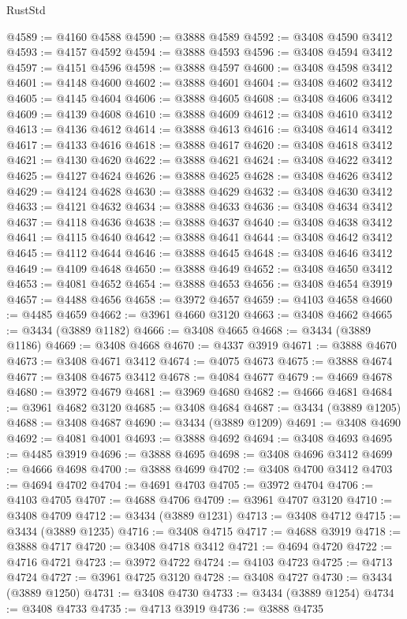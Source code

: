 \begin{lexlean}{RustStd}
\begin{coremodule}
@4589 := @4160 @4588
@4590 := @3888 @4589
@4592 := @3408 @4590 @3412
@4593 := @4157 @4592
@4594 := @3888 @4593
@4596 := @3408 @4594 @3412
@4597 := @4151 @4596
@4598 := @3888 @4597
@4600 := @3408 @4598 @3412
@4601 := @4148 @4600
@4602 := @3888 @4601
@4604 := @3408 @4602 @3412
@4605 := @4145 @4604
@4606 := @3888 @4605
@4608 := @3408 @4606 @3412
@4609 := @4139 @4608
@4610 := @3888 @4609
@4612 := @3408 @4610 @3412
@4613 := @4136 @4612
@4614 := @3888 @4613
@4616 := @3408 @4614 @3412
@4617 := @4133 @4616
@4618 := @3888 @4617
@4620 := @3408 @4618 @3412
@4621 := @4130 @4620
@4622 := @3888 @4621
@4624 := @3408 @4622 @3412
@4625 := @4127 @4624
@4626 := @3888 @4625
@4628 := @3408 @4626 @3412
@4629 := @4124 @4628
@4630 := @3888 @4629
@4632 := @3408 @4630 @3412
@4633 := @4121 @4632
@4634 := @3888 @4633
@4636 := @3408 @4634 @3412
@4637 := @4118 @4636
@4638 := @3888 @4637
@4640 := @3408 @4638 @3412
@4641 := @4115 @4640
@4642 := @3888 @4641
@4644 := @3408 @4642 @3412
@4645 := @4112 @4644
@4646 := @3888 @4645
@4648 := @3408 @4646 @3412
@4649 := @4109 @4648
@4650 := @3888 @4649
@4652 := @3408 @4650 @3412
@4653 := @4081 @4652
@4654 := @3888 @4653
@4656 := @3408 @4654 @3919
@4657 := @4488 @4656
@4658 := @3972 @4657
@4659 := @4103 @4658
@4660 := @4485 @4659
@4662 := @3961 @4660 @3120
@4663 := @3408 @4662
@4665 := @3434 (@3889 @1182)
@4666 := @3408 @4665
@4668 := @3434 (@3889 @1186)
@4669 := @3408 @4668
@4670 := @4337 @3919
@4671 := @3888 @4670
@4673 := @3408 @4671 @3412
@4674 := @4075 @4673
@4675 := @3888 @4674
@4677 := @3408 @4675 @3412
@4678 := @4084 @4677
@4679 := @4669 @4678
@4680 := @3972 @4679
@4681 := @3969 @4680
@4682 := @4666 @4681
@4684 := @3961 @4682 @3120
@4685 := @3408 @4684
@4687 := @3434 (@3889 @1205)
@4688 := @3408 @4687
@4690 := @3434 (@3889 @1209)
@4691 := @3408 @4690
@4692 := @4081 @4001
@4693 := @3888 @4692
@4694 := @3408 @4693
@4695 := @4485 @3919
@4696 := @3888 @4695
@4698 := @3408 @4696 @3412
@4699 := @4666 @4698
@4700 := @3888 @4699
@4702 := @3408 @4700 @3412
@4703 := @4694 @4702
@4704 := @4691 @4703
@4705 := @3972 @4704
@4706 := @4103 @4705
@4707 := @4688 @4706
@4709 := @3961 @4707 @3120
@4710 := @3408 @4709
@4712 := @3434 (@3889 @1231)
@4713 := @3408 @4712
@4715 := @3434 (@3889 @1235)
@4716 := @3408 @4715
@4717 := @4688 @3919
@4718 := @3888 @4717
@4720 := @3408 @4718 @3412
@4721 := @4694 @4720
@4722 := @4716 @4721
@4723 := @3972 @4722
@4724 := @4103 @4723
@4725 := @4713 @4724
@4727 := @3961 @4725 @3120
@4728 := @3408 @4727
@4730 := @3434 (@3889 @1250)
@4731 := @3408 @4730
@4733 := @3434 (@3889 @1254)
@4734 := @3408 @4733
@4735 := @4713 @3919
@4736 := @3888 @4735

\end{coremodule}
\end{lexlean}
